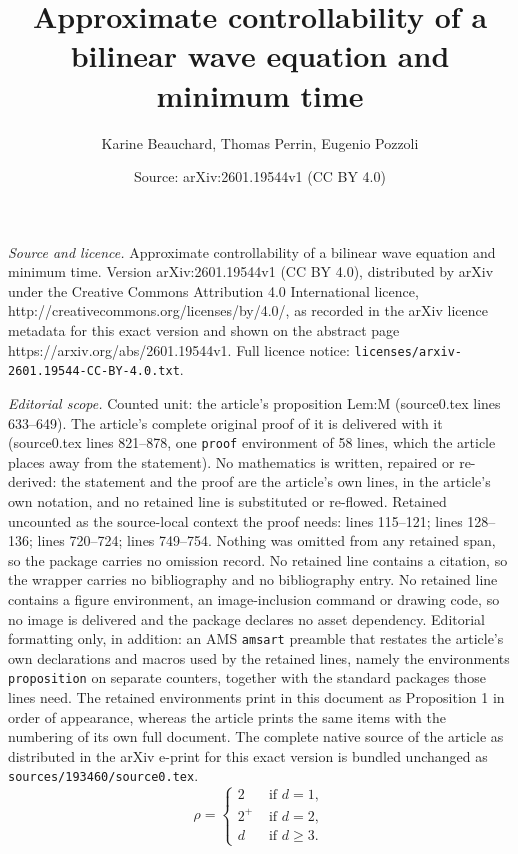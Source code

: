 \documentclass[10pt,a4paper]{amsart}
\title{Approximate controllability of a bilinear wave equation and minimum time}
\author{Karine Beauchard, Thomas Perrin, Eugenio Pozzoli}
\date{Source: arXiv:2601.19544v1 (CC BY 4.0)}
\begin{document}
\maketitle

\noindent\emph{Source and licence.} Approximate controllability of a bilinear wave equation and minimum time. Version arXiv:2601.19544v1 (CC BY 4.0), distributed by arXiv under the Creative Commons Attribution 4.0 International licence, http://creativecommons.org/licenses/by/4.0/, as recorded in the arXiv licence metadata for this exact version and shown on the abstract page https://arxiv.org/abs/2601.19544v1. Full licence notice: \texttt{licenses/arxiv-2601.19544-CC-BY-4.0.txt}.\par\smallskip

\noindent\textit{Editorial scope.} Counted unit: the article's proposition Lem:M (source0.tex lines 633--649). The article's complete original proof of it is delivered with it (source0.tex lines 821--878, one \texttt{proof} environment of 58 lines, which the article places away from the statement). No mathematics is written, repaired or re-derived: the statement and the proof are the article's own lines, in the article's own notation, and no retained line is substituted or re-flowed.  Retained uncounted as the source-local context the proof needs: lines 115--121; lines 128--136; lines 720--724; lines 749--754.  Nothing was omitted from any retained span, so the package carries no omission record.  No retained line contains a citation, so the wrapper carries no bibliography and no bibliography entry.  No retained line contains a figure environment, an image-inclusion command or drawing code, so no image is delivered and the package declares no asset dependency.  Editorial formatting only, in addition: an AMS \texttt{amsart} preamble that restates the article's own declarations and macros used by the retained lines, namely the environments \texttt{proposition} on separate counters, together with the standard packages those lines need.  The retained environments print in this document as Proposition 1 in order of appearance, whereas the article prints the same items with the numbering of its own full document.  The complete native source of the article as distributed in the arXiv e-print for this exact version is bundled unchanged as \texttt{sources/193460/source0.tex}.
\begin{equation} \label{def:q_rho}
\rho = \left\lbrace \begin{array}{ll}
2 & \text{ if } d=1, \\
2^+ & \text{ if } d=2, \\
d & \text{ if } d \geq 3.
\end{array}\right.
\end{equation}
\end{document}
